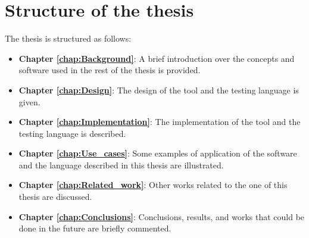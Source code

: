\section{Structure of the thesis}
The thesis is structured as follows:
\begin{itemize}
    \item \textbf{Chapter \ref{chap:Background}}: A brief introduction over the concepts and software used in the rest of the thesis is provided.
    \item \textbf{Chapter \ref{chap:Design}}: The design of the tool and the testing language is given.
    \item \textbf{Chapter \ref{chap:Implementation}}: The implementation of the tool and the testing language is described.
    \item \textbf{Chapter \ref{chap:Use_cases}}: Some examples of application of the software and the language described in this thesis are illustrated.
    \item \textbf{Chapter \ref{chap:Related_work}}: Other works related to the one of this thesis are discussed.
    \item \textbf{Chapter \ref{chap:Conclusions}}: Conclusions, results, and works that could be done in the future are briefly commented.
\end{itemize}




